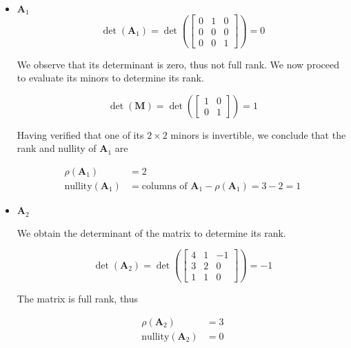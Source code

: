 \begin{itemize}
 \item $\mathbf{A}_1$
 \begin{equation*}
  \det(\mathbf{A}_1) = \det\left(\begin{bmatrix}
                                    0 & 1 & 0\\ 0 & 0 & 0\\0 & 0 & 1
                                 \end{bmatrix} \right) = 0
 \end{equation*}

 We observe that its determinant is zero, thus not full rank.
We now proceed to evaluate its minors to determine its rank.

\begin{equation*}
\det(\mathbf{M}) = \det \left(\begin{bmatrix} 1&0\\ 0&1 \end{bmatrix} \right) = 1
\end{equation*}

Having verified that one of its $2 \times 2$ minors is invertible,
we conclude that the rank and nullity of $\mathbf{A}_1$ are

\begin{align*}
 \rho (\mathbf{A}_1) &= 2 \\
 \text{nullity}(\mathbf{A}_1) &= \text{columns of } \mathbf{A}_1 - \rho(\mathbf{A}_1) = 3 -2 =  1
\end{align*}

 \item $\mathbf{A}_2$

 We obtain the determinant of the matrix to determine its rank.

 \begin{equation*}
  \det(\mathbf{A}_2) = \det\left(\begin{bmatrix}
      4 & 1 & -1\\
      3 & 2 & 0\\
      1 & 1 & 0
     \end{bmatrix}
\right) = -1
 \end{equation*}

 The matrix is full rank, thus

\begin{align*}
 \rho (\mathbf{A}_2) &= 3 \\
 \text{nullity}(\mathbf{A}_2) &= 0
\end{align*}



\end{itemize}
